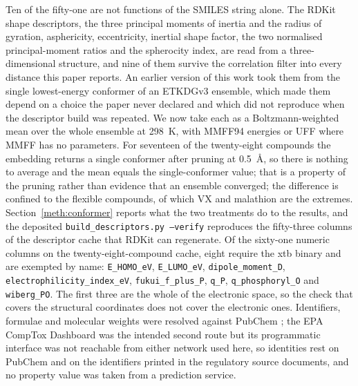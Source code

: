 \documentclass[11pt,a4paper]{article}
\begin{document}
Ten of the fifty-one are not functions of the SMILES string alone. The RDKit
shape descriptors, the three principal moments of inertia and the radius of
gyration, asphericity, eccentricity, inertial shape factor, the two normalised
principal-moment ratios and the spherocity index, are read from a
three-dimensional structure, and nine of them survive the correlation filter
into every distance this paper reports. An earlier version of this work took
them from the single lowest-energy conformer of an ETKDGv3 ensemble, which made
them depend on a choice the paper never declared and which did not reproduce
when the descriptor build was repeated. We now take each as a
Boltzmann-weighted mean over the whole ensemble at 298~K, with MMFF94 energies
or UFF where MMFF has no parameters. For seventeen of the twenty-eight
compounds the embedding returns a single conformer after pruning at
0.5~\AA, so there is nothing to average and the mean equals the
single-conformer value; that is a property of the pruning rather than evidence
that an ensemble converged; the difference is confined to the flexible
compounds, of which VX and malathion are the extremes. Section~\ref{meth:conformer}
reports what the two treatments do to the results, and the deposited
\texttt{build\_descriptors.py --verify} reproduces the fifty-three columns of the
descriptor cache that RDKit can regenerate. Of the sixty-one numeric columns on the
twenty-eight-compound cache, eight require the xtb binary and are exempted by name:
\texttt{E\_HOMO\_eV}, \texttt{E\_LUMO\_eV}, \texttt{dipole\_moment\_D},
\texttt{electrophilicity\_index\_eV}, \texttt{fukui\_f\_plus\_P}, \texttt{q\_P},
\texttt{q\_phosphoryl\_O} and \texttt{wiberg\_PO}. The first three are the whole of
the electronic space, so the check that covers the structural coordinates does not
cover the electronic ones.
Identifiers, formulae and molecular weights were resolved against PubChem
\cite{pubchem2025}; the EPA CompTox Dashboard \cite{williams2017} was the
intended second route but its programmatic interface was not reachable from
either network used here, so identities rest on PubChem and on the identifiers
printed in the regulatory source documents, and no property value was taken from
a prediction service.
\end{document}
